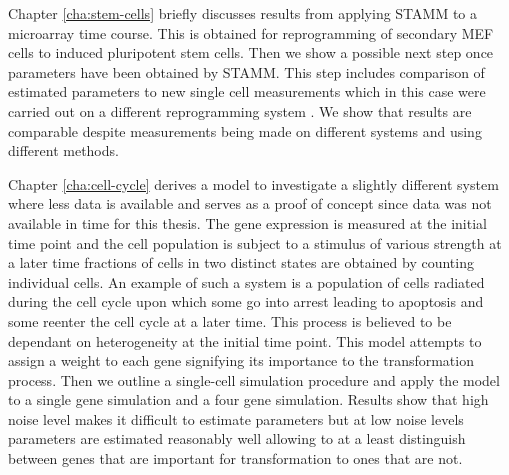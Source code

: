 Chapter \ref{cha:stem-cells} briefly discusses results from applying STAMM to a microarray time course. This is obtained for  reprogramming of secondary MEF cells to induced pluripotent stem cells. Then we show a possible next step once parameters have been obtained by STAMM. This step includes comparison of estimated parameters to new single cell measurements which in this case were carried out on a different reprogramming system \citep{Buganim:2012hp}. We show that results are comparable despite measurements being made on different systems and using different methods.

Chapter \ref{cha:cell-cycle} derives a model to investigate a slightly different system where less data is available and serves as a proof of concept since data was not available in time for this thesis. The gene expression is measured at the initial time point and the cell population is subject to a stimulus of various strength at a later time fractions of cells in two distinct states are obtained by counting individual cells. An example of such a system is a population of cells radiated during the cell cycle upon which some go into arrest leading to apoptosis and some reenter the cell cycle at a later time. This process is believed to be dependant on heterogeneity at the initial time point. This model attempts to assign a weight to each gene signifying its importance to the transformation process. Then we outline a single-cell simulation procedure and apply the model to a single gene simulation and a four gene simulation. Results show that high noise level makes it difficult to estimate parameters but at low noise levels parameters are estimated reasonably well allowing to at a least distinguish between genes that are important for transformation to ones that are not. 

